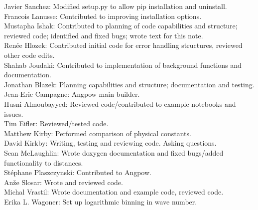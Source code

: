 Javier Sanchez: Modified setup.py to allow pip installation and uninstall. \\
Francois Lanusse: Contributed to improving installation options. \\
Mustapha Ishak: Contributed to planning of code capabilities and structure; reviewed code; identified and fixed bugs; wrote text for this note. \\
Ren\'ee Hlozek: Contributed initial code for error handling structures, reviewed other code edits. \\
Shahab Joudaki: Contributed to implementation of background functions and documentation. \\
Jonathan Blazek: Planning capabilities and structure; documentation and testing. \\
Jean-Eric Campagne: Angpow main builder. \\
Husni Almoubayyed: Reviewed code/contributed to example notebooks and issues. \\
Tim Eifler: Reviewed/tested code. \\
Matthew Kirby: Performed comparison of physical constants. \\
David Kirkby: Writing, testing and reviewing code. Asking questions. \\
Sean McLaughlin: Wrote doxygen documentation and fixed bugs/added functionality to distances. \\
St\'ephane Plaszczynski: Contributed to Angpow. \\
An\v{z}e Slosar: Wrote and reviewed code. \\
Michal Vrastil: Wrote documentation and example code, reviewed code. \\
Erika L. Wagoner: Set up logarithmic binning in wave number. \\

